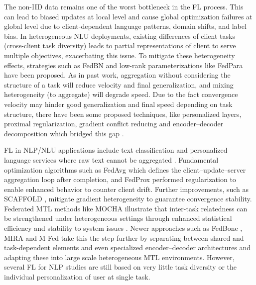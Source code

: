 The non-IID data remains one of the worst bottleneck in the FL process. This can lead to biased updates at local level and cause global optimization failures at global level due to client-dependent language patterns, domain shifts, and label bias. In heterogeneous NLU deployments, existing differences of client tasks (cross-client task diversity) leads to partial representations of client to serve multiple objectives, exacerbating this issue. To mitigate these heterogeneity effects, strategies such as FedBN \cite{li2021fedbn} and low-rank parameterizations like FedPara \cite{nam2021fedpara} have been proposed. As in past work, aggregation without considering the structure of a task will reduce velocity and final generalization, and mixing heterogeneity (to aggregate) will degrade speed. Due to the fact convergence velocity may hinder good generalization and final speed depending on task structure, there have been some proposed techniques, like personalized layers, proximal regularization, gradient conflict reducing and encoder--decoder decomposition which bridged this gap \cite{li2020federated_prox,yu2020gradient,zhou2025multi}.

FL in NLP/NLU applications include text classification and personalized language services where raw text cannot be aggregated \cite{mcmahan2017communication,li2020federated_prox}. Fundamental optimization algorithms such as FedAvg \cite{mcmahan2017communication} which defines the client–update–server aggregation loop after completion, and FedProx \cite{li2020federated_prox} performed regularization to enable enhanced behavior to counter client drift. Further improvements, such as SCAFFOLD \cite{karimireddy2020scaffold}, mitigate gradient heterogeneity to guarantee convergence stability. Federated MTL methods like MOCHA illustrate that inter-task relatedness can be strengthened under heterogeneous settings through enhanced statistical efficiency and stability to system issues \cite{smith2017federated}. Newer approaches such as FedBone \cite{chen2024fedbone}, MIRA \cite{elbakary2025mira} and M-Fed \cite{zhou2025multi} take this the step further by separating between shared and task-dependent elements and even specialized encoder--decoder architectures and adapting these into large scale heterogeneous MTL environments. However, several FL for NLP studies are still based on very little task diversity or the individual personalization of user at single task.

